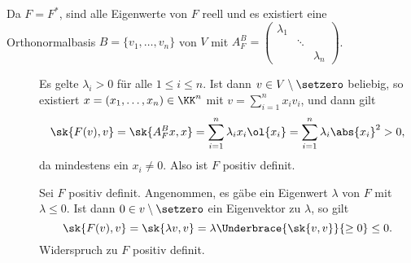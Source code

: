\begin{beweis}
	Da $F = F^*$, sind alle Eigenwerte von $F$ reell und es existiert eine Orthonormalbasis $B = \{v_1,\dots,v_n\}$ von $V$ mit $A^B_F = \begin{pmatrix}
	\lambda_1 & & \\ & \ddots & \\ & & \lambda_n \end{pmatrix}$.
	\begin{description}
		\item[\bewrueck] Es gelte $\lambda_i > 0$ für alle $1 \leq i \leq n$.
		Ist dann $v \in V \setminus \setzero$ beliebig, so existiert  $x = (x_1,\dots,x_n) \in \KK^n$ mit $v = \sum_{i=1}^{n} x_i v_i$, und dann gilt
		\[
			\sk{F(v),v} = \sk{A_F^B x,x} = \sum_{i=1}^{n} \lambda_i x_i \ol{x_i} = \sum_{i=1}^{n} \lambda_i \abs{x_i}^2 > 0,
		\]
		da mindestens ein $x_i \neq 0$.
		Also ist $F$ positiv definit.
		\item[\bewhin] Sei $F$ positiv definit.
		Angenommen, es gäbe ein Eigenwert $\lambda$ von $F$ mit $\lambda \leq 0$.
		Ist dann $0 \in v \setminus \setzero$ ein Eigenvektor zu $\lambda$, so gilt
		\[
			\sk{F(v),v} = \sk{\lambda v,v} = \lambda \Underbrace{\sk{v,v}}{\geq 0} \leq 0.
		\]
		Widerspruch zu $F$ positiv definit. 
	\end{description}
\end{beweis}
\newpage